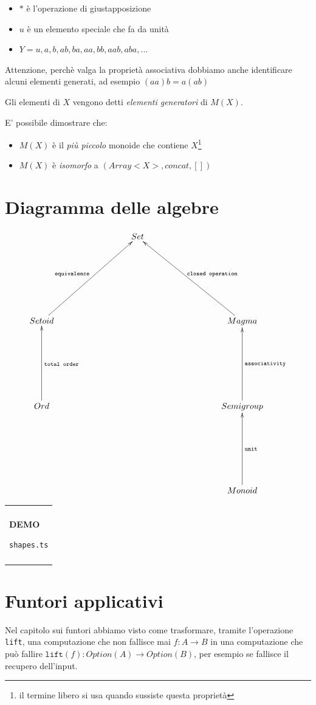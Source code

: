 \documentclass[12pt]{article}
\newenvironment{demo}
    {\begin{center}
    \begin{tabular}{|p{0.9\textwidth}|}
    \hline\\
    }
    {
    \\\\\hline
    \end{tabular}
    \end{center}
    }
\begin{document}
\begin{itemize}
  \item $*$ è l'operazione di giustapposizione
  \item $u$ è un elemento speciale che fa da unità
  \item $Y = { u, a, b, ab, ba, aa, bb, aab, aba, ... }$
\end{itemize}

Attenzione, perchè valga la proprietà associativa dobbiamo anche identificare alcuni elementi generati, ad esempio $(aa)b = a(ab)$

Gli elementi di $X$ vengono detti \emph{elementi generatori} di $M(X)$.

E' possibile dimostrare che:

\begin{itemize}
  \item $M(X)$ è il \emph{più piccolo} monoide che contiene $X$\footnote{il termine libero si usa quando sussiste questa proprietà}
  \item $M(X)$ è \emph{isomorfo} a $(Array<X>, concat, [])$
\end{itemize}

\section{Diagramma delle algebre}

\[
\xymatrixrowsep{3cm}
\xymatrixcolsep{3cm}
\xymatrix{
  & Set \\
  Setoid \ar[ur]^{\texttt{equivalence}} & & Magma \ar[ul]_{\texttt{closed operation}} \\
  Ord \ar[u]_{\texttt{total order}} & & Semigroup \ar[u]_{\texttt{associativity}} \\
  & & Monoid \ar[u]_{\texttt{unit}} \\
}
\]

\begin{demo}
\begin{center}
\textbf{DEMO}

\texttt{shapes.ts}
\end{center}
\end{demo}

\newpage

\section{Funtori applicativi}

Nel capitolo sui funtori abbiamo visto come trasformare, tramite l'operazione \texttt{lift},
una computazione che non fallisce mai $f: A \rightarrow B$ in una computazione che può fallire $\texttt{lift}(f): Option(A) \rightarrow Option(B)$,
per esempio se fallisce il recupero dell'input.
\end{document}
